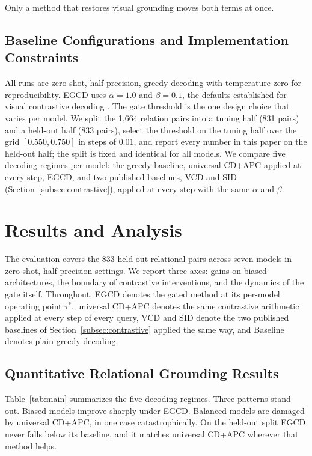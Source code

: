 \documentclass[pdflatex,sn-basic,Numbered]{sn-jnl}
\theoremstyle{thmstyleone}
\theoremstyle{thmstyletwo}
\theoremstyle{thmstylethree}
\begin{document}
Only a method that restores visual grounding moves both terms at once.

\subsection{Baseline Configurations and Implementation Constraints}\label{subsec:baselines}

All runs are zero-shot, half-precision, greedy decoding with temperature zero for reproducibility. EGCD uses $\alpha = 1.0$ and $\beta = 0.1$, the defaults established for visual contrastive decoding \cite{leng2024mitigating}. The gate threshold is the one design choice that varies per model. We split the 1,664 relation pairs into a tuning half (831 pairs) and a held-out half (833 pairs), select the threshold on the tuning half over the grid $[0.550, 0.750]$ in steps of $0.01$, and report every number in this paper on the held-out half; the split is fixed and identical for all models. We compare five decoding regimes per model: the greedy baseline, universal CD+APC applied at every step, EGCD, and two published baselines, VCD and SID (Section~\ref{subsec:contrastive}), applied at every step with the same $\alpha$ and $\beta$.

\section{Results and Analysis}\label{sec:results}

The evaluation covers the 833 held-out relational pairs across seven models in zero-shot, half-precision settings. We report three axes: gains on biased architectures, the boundary of contrastive interventions, and the dynamics of the gate itself. Throughout, EGCD denotes the gated method at its per-model operating point $\tau^{*}$, universal CD+APC denotes the same contrastive arithmetic applied at every step of every query, VCD and SID denote the two published baselines of Section~\ref{subsec:contrastive} applied the same way, and Baseline denotes plain greedy decoding.

\subsection{Quantitative Relational Grounding Results}\label{subsec:quant}

Table~\ref{tab:main} summarizes the five decoding regimes. Three patterns stand out. Biased models improve sharply under EGCD. Balanced models are damaged by universal CD+APC, in one case catastrophically. On the held-out split EGCD never falls below its baseline, and it matches universal CD+APC wherever that method helps.
\end{document}
